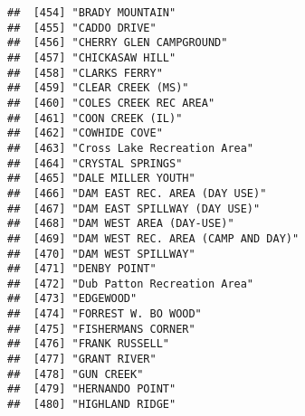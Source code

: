 \documentclass[
]{article}
\begin{document}
\begin{verbatim}
##  [454] "BRADY MOUNTAIN"                                                                      
##  [455] "CADDO DRIVE"                                                                         
##  [456] "CHERRY GLEN CAMPGROUND"                                                              
##  [457] "CHICKASAW HILL"                                                                      
##  [458] "CLARKS FERRY"                                                                        
##  [459] "CLEAR CREEK (MS)"                                                                    
##  [460] "COLES CREEK REC AREA"                                                                
##  [461] "COON CREEK (IL)"                                                                     
##  [462] "COWHIDE COVE"                                                                        
##  [463] "Cross Lake Recreation Area"                                                          
##  [464] "CRYSTAL SPRINGS"                                                                     
##  [465] "DALE MILLER YOUTH"                                                                   
##  [466] "DAM EAST REC. AREA (DAY USE)"                                                        
##  [467] "DAM EAST SPILLWAY (DAY USE)"                                                         
##  [468] "DAM WEST AREA (DAY-USE)"                                                             
##  [469] "DAM WEST REC. AREA (CAMP AND DAY)"                                                   
##  [470] "DAM WEST SPILLWAY"                                                                   
##  [471] "DENBY POINT"                                                                         
##  [472] "Dub Patton Recreation Area"                                                          
##  [473] "EDGEWOOD"                                                                            
##  [474] "FORREST W. BO WOOD"                                                                  
##  [475] "FISHERMANS CORNER"                                                                   
##  [476] "FRANK RUSSELL"                                                                       
##  [477] "GRANT RIVER"                                                                         
##  [478] "GUN CREEK"                                                                           
##  [479] "HERNANDO POINT"                                                                      
##  [480] "HIGHLAND RIDGE"                                                                      

\end{verbatim}
\end{document}

